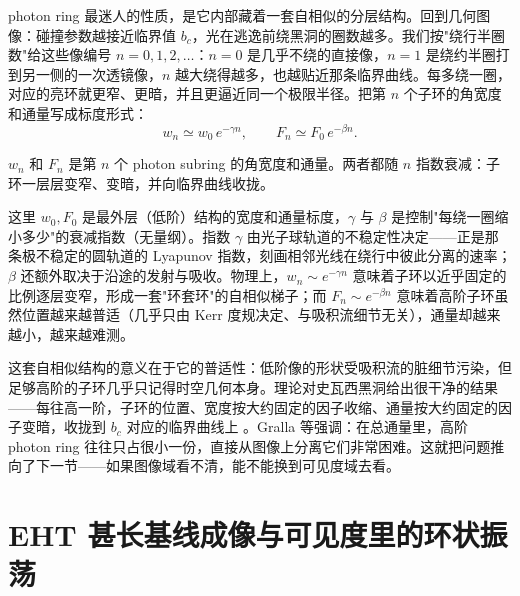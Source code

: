 photon ring 最迷人的性质，是它内部藏着一套自相似的分层结构。回到几何图像：碰撞参数越接近临界值 \(b_c\)，光在逃逸前绕黑洞的圈数越多。我们按"绕行半圈数"给这些像编号 \(n=0,1,2,\dots\)：\(n=0\) 是几乎不绕的直接像，\(n=1\) 是绕约半圈打到另一侧的一次透镜像，\(n\) 越大绕得越多，也越贴近那条临界曲线。每多绕一圈，对应的亮环就更窄、更暗，并且更逼近同一个极限半径。把第 \(n\) 个子环的角宽度和通量写成标度形式：
\begin{equation}
  w_n\simeq w_0\,e^{-\gamma n},\qquad
  F_n\simeq F_0\,e^{-\beta n}.
  \label{eq:e19-subring}
\end{equation}
\begin{formulaexplain}
\(w_n\) 和 \(F_n\) 是第 \(n\) 个 photon subring 的角宽度和通量。两者都随 \(n\) 指数衰减：子环一层层变窄、变暗，并向临界曲线收拢。
\end{formulaexplain}
这里 \(w_0,F_0\) 是最外层（低阶）结构的宽度和通量标度，\(\gamma\) 与 \(\beta\) 是控制"每绕一圈缩小多少"的衰减指数（无量纲）。指数 \(\gamma\) 由光子球轨道的不稳定性决定——正是那条极不稳定的圆轨道的 Lyapunov 指数，刻画相邻光线在绕行中彼此分离的速率；\(\beta\) 还额外取决于沿途的发射与吸收。物理上，\(w_n\sim e^{-\gamma n}\) 意味着子环以近乎固定的比例逐层变窄，形成一套"环套环"的自相似梯子；而 \(F_n\sim e^{-\beta n}\) 意味着高阶子环虽然位置越来越普适（几乎只由 Kerr 度规决定、与吸积流细节无关），通量却越来越小，越来越难测。

这套自相似结构的意义在于它的普适性：低阶像的形状受吸积流的脏细节污染，但足够高阶的子环几乎只记得时空几何本身。理论对史瓦西黑洞给出很干净的结果——每往高一阶，子环的位置、宽度按大约固定的因子收缩、通量按大约固定的因子变暗，收拢到 \(b_c\) 对应的临界曲线上 \citep{2019PhRvD.100b4018G,2020PhRvD.102l4004G,2020SciA....6.1310J}。Gralla 等强调：在总通量里，高阶 photon ring 往往只占很小一份，直接从图像上分离它们非常困难。这就把问题推向了下一节——如果图像域看不清，能不能换到可见度域去看。

\section{EHT 甚长基线成像与可见度里的环状振荡}
\label{sec:e19-visibility}


